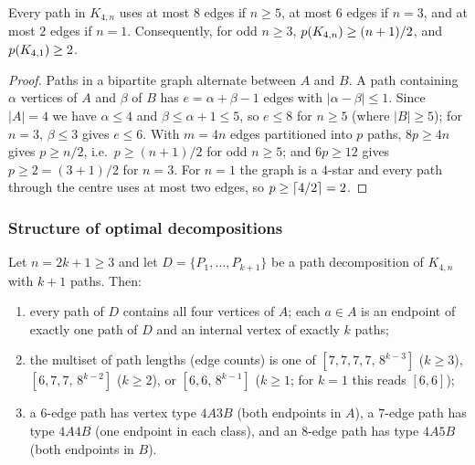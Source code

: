 \begin{lemma}\label{lem:concap}
Every path in $K_{4,n}$ uses at most $8$ edges if $n\ge5$, at most $6$ edges
if $n=3$, and at most $2$ edges if $n=1$. Consequently, for odd $n\ge3$,
$p(K_{4,n})\ge(n+1)/2$, and $p(K_{4,1})\ge2$.
\end{lemma}

\begin{proof}
Paths in a bipartite graph alternate between $A$ and $B$. A path containing
$\alpha$ vertices of $A$ and $\beta$ of $B$ has $e=\alpha+\beta-1$ edges
with $|\alpha-\beta|\le1$. Since $|A|=4$ we have $\alpha\le4$ and
$\beta\le\alpha+1\le5$, so $e\le8$ for $n\ge5$ (where $|B|\ge5$); for
$n=3$, $\beta\le3$ gives $e\le6$. With $m=4n$ edges partitioned into $p$
paths, $8p\ge4n$ gives $p\ge n/2$, i.e.\ $p\ge(n+1)/2$ for odd $n\ge5$; and
$6p\ge12$ gives $p\ge2=(3+1)/2$ for $n=3$. For $n=1$ the graph is a
$4$-star and every path through the centre uses at most two edges, so
$p\ge\left\lceil 4/2 \right\rceil=2$.
\end{proof}

\subsubsection{Structure of optimal decompositions}

\begin{theorem}\label{thm:conk4struct}
Let $n=2k+1\ge3$ and let $D=\{P_1,\dots,P_{k+1}\}$ be a path decomposition
of $K_{4,n}$ with $k+1$ paths. Then:
\begin{enumerate}[label={\rm(\arabic*)},leftmargin=2em]
\item every path of $D$ contains all four vertices of $A$; each $a\in A$ is
an endpoint of exactly one path of $D$ and an internal vertex of exactly
$k$ paths;
\item the multiset of path lengths (edge counts) is one of
$[7,7,7,7,\,8^{k-3}]$ ($k\ge3$), $[6,7,7,\,8^{k-2}]$ ($k\ge2$), or
$[6,6,\,8^{k-1}]$ ($k\ge1$; for $k=1$ this reads $[6,6]$);
\item a $6$-edge path has vertex type $4A3B$ (both endpoints in $A$), a
$7$-edge path has type $4A4B$ (one endpoint in each class), and an
$8$-edge path has type $4A5B$ (both endpoints in $B$).
\end{enumerate}
\end{theorem}

